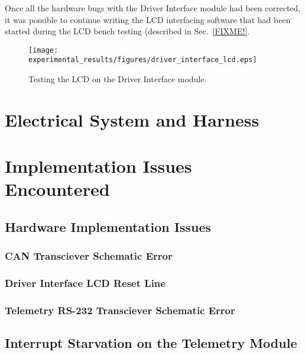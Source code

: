 Once all the hardware bugs with the Driver Interface module had been corrected, it was possible to continue writing the LCD interfacing software that had been started during the LCD bench testing (described in Sec.\ \ref{FIXME!}.

\begin{figure}[h]
 \centering
 \texttt{[image: experimental\_results/figures/driver\_interface\_lcd.eps]}
 \caption{Testing the LCD on the Driver Interface module.}
 \label{fig:driver_interface_lcd}
\end{figure}

\section{Electrical System and Harness}




\section{Implementation Issues Encountered}


\subsection{Hardware Implementation Issues}


\subsubsection{CAN Transciever Schematic Error}


\subsubsection{Driver Interface LCD Reset Line}


\subsubsection{Telemetry RS-232 Transciever Schematic Error}


\subsection{Interrupt Starvation on the Telemetry Module}

